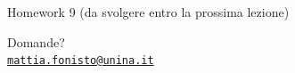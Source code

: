 \documentclass[10pt,aspectratio=169]{beamer}
\begin{document}
\begin{frame}{Homework 9 (da svolgere entro la prossima lezione)}
\begin{enumerate}
\end{enumerate}
\end{frame}

\begin{frame}
\begin{center}
{\Huge Domande?}\\[2em]
{\normalsize \href{mailto:mattia.fonisto@unina.it}{\texttt{mattia.fonisto@unina.it}}}
\end{center}
\end{frame}
\end{document}
